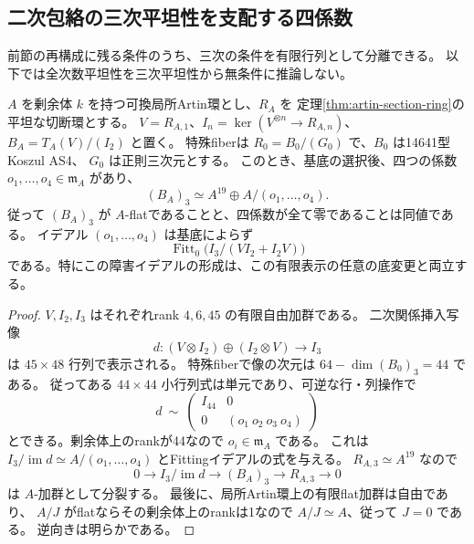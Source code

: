 \subsection{二次包絡の三次平坦性を支配する四係数}
\label{sec:quadratic-four-obstructions}
前節の再構成に残る条件のうち、三次の条件を有限行列として分離できる。
以下では全次数平坦性を三次平坦性から無条件に推論しない。

\begin{proposition}\label{prop:four-cubic-obstructions}
$A$ を剰余体 $k$ を持つ可換局所Artin環とし、$R_A$ を
定理\ref{thm:artin-section-ring}の平坦な切断環とする。
$V=R_{A,1}$、$I_n=\ker(V^{\otimes n}\to R_{A,n})$、
$B_A=T_A(V)/(I_2)$ と置く。
特殊fiberは $R_0=B_0/(G_0)$ で、$B_0$ は14641型Koszul AS4、
$G_0$ は正則三次元とする。
このとき、基底の選択後、四つの係数 $o_1,\ldots,o_4\in\mathfrak m_A$ があり、
\[
 (B_A)_3\simeq A^{19}\oplus A/(o_1,\ldots,o_4).
\]
従って $(B_A)_3$ が $A$-flatであることと、四係数が全て零であることは同値である。
イデアル $(o_1,\ldots,o_4)$ は基底によらず
\[
 \operatorname{Fitt}_0\bigl(I_3/(V I_2+I_2V)\bigr)
\]
である。特にこの障害イデアルの形成は、この有限表示の任意の底変更と両立する。
\end{proposition}
\begin{proof}
$V,I_2,I_3$ はそれぞれrank $4,6,45$ の有限自由加群である。
二次関係挿入写像
\[
 d:(V\otimes I_2)\oplus(I_2\otimes V)\longrightarrow I_3
\]
は $45\times48$ 行列で表示される。
特殊fiberで像の次元は $64-\dim(B_0)_3=44$ である。
従ってある $44\times44$ 小行列式は単元であり、可逆な行・列操作で
\[
 d\ \sim\
 \begin{pmatrix}I_{44}&0\\0&(o_1\ o_2\ o_3\ o_4)\end{pmatrix}
\]
とできる。剰余体上のrankが44なので $o_i\in\mathfrak m_A$ である。
これは $I_3/\operatorname{im}d\simeq A/(o_1,\ldots,o_4)$ とFittingイデアルの式を与える。
$R_{A,3}\simeq A^{19}$ なので
\[
 0\longrightarrow I_3/\operatorname{im}d\longrightarrow(B_A)_3
 \longrightarrow R_{A,3}\longrightarrow0
\]
は $A$-加群として分裂する。
最後に、局所Artin環上の有限flat加群は自由であり、
$A/J$ がflatならその剰余体上のrankは1なので $A/J\simeq A$、従って $J=0$ である。
逆向きは明らかである。
\end{proof}

